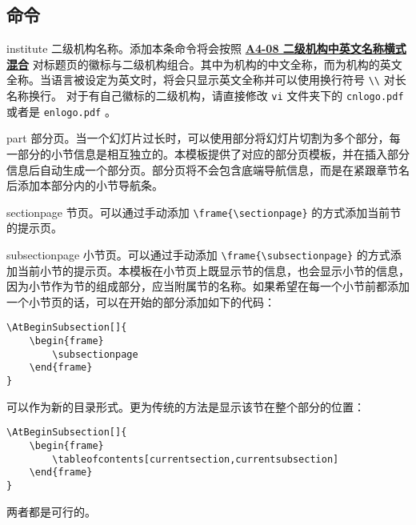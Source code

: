 \documentclass[a4paper,12pt]{article}
\begin{document}
\begin{CJK}{UTF8}{song}
\section{命令}

\begin{docCommand*}[]{institute}{}
    二级机构名称。添加本条命令将会按照 \href{https://vi.sjtu.edu.cn/index.php/articles/base/4}{\textbf{A4-08 二级机构中英文名称横式混合}} 对标题页的徽标与二级机构组合。其中为机构的中文全称，而为机构的英文全称。当语言被设定为英文时，将会只显示英文全称并可以使用换行符号 \verb"\\" 对长名称换行。
    对于有自己徽标的二级机构，请直接修改 \verb"vi" 文件夹下的 \verb"cnlogo.pdf" 或者是 \verb"enlogo.pdf" 。
\end{docCommand*}

\begin{docCommand*}[]{part}{}
    部分页。当一个幻灯片过长时，可以使用部分将幻灯片切割为多个部分，每一部分的小节信息是相互独立的。本模板提供了对应的部分页模板，并在插入部分信息后自动生成一个部分页。部分页将不会包含底端导航信息，而是在紧跟章节名后添加本部分内的小节导航条。
\end{docCommand*}

\begin{docCommand*}[]{sectionpage}{}
    节页。可以通过手动添加 \verb"\frame{\sectionpage}" 的方式添加当前节的提示页。
\end{docCommand*}

\begin{docCommand*}[]{subsectionpage}{}
    小节页。可以通过手动添加 \verb"\frame{\subsectionpage}" 的方式添加当前小节的提示页。本模板在小节页上既显示节的信息，也会显示小节的信息，因为小节作为节的组成部分，应当附属节的名称。如果希望在每一个小节前都添加一个小节页的话，可以在开始的部分添加如下的代码：
    \begin{verbatim}
\AtBeginSubsection[]{
    \begin{frame}
        \subsectionpage
    \end{frame}
}\end{verbatim}
    可以作为新的目录形式。更为传统的方法是显示该节在整个部分的位置：
    \begin{verbatim}
\AtBeginSubsection[]{
    \begin{frame}
        \tableofcontents[currentsection,currentsubsection]
    \end{frame}
}\end{verbatim}
    两者都是可行的。
\end{docCommand*}


\end{CJK}
\end{document}
